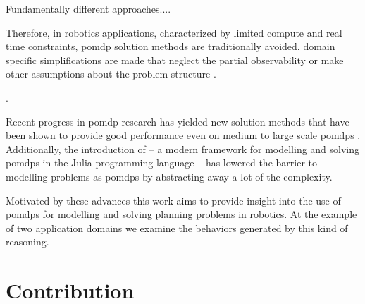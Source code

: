 Fundamentally different approaches....


Therefore, in robotics applications, characterized by limited compute and real
time constraints, \ac{pomdp} solution methods are traditionally avoided. domain
specific simplifications are made that neglect the partial observability or
make other assumptions about the problem structure \cite{sadigh2016information,
fisac2018probabilistically}. 


.

Recent progress in \ac{pomdp} research has yielded new solution methods that
have been shown to provide good performance even on medium to large scale
\acp{pomdp} \cite{somani2013despot,sunberg2018online}. Additionally, the
introduction of \pomdpsjl \cite{egorov2017pomdps} -- a modern framework for
modelling and solving \acp{pomdp} in the Julia programming language -- has
lowered the barrier to modelling problems as \acp{pomdp} by abstracting away
a lot of the complexity.

Motivated by these advances this work aims to provide insight into the use of
\acp{pomdp} for modelling and solving planning problems in robotics. At the
example of two application domains we examine the behaviors generated by this
kind of reasoning.\\

\section{Contribution}\label{sec:contribution}


